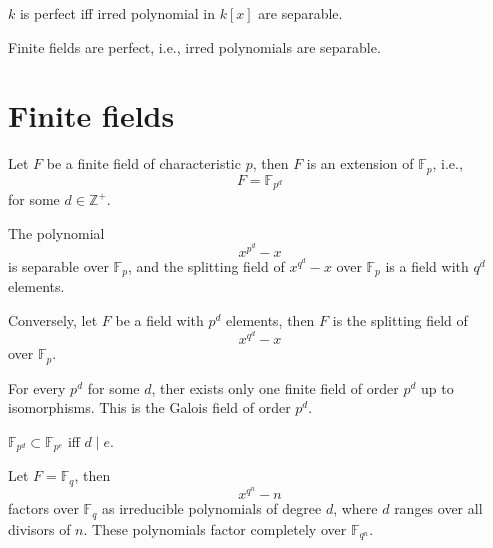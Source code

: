 \documentclass[openany]{book}
\newcommand{\Z}{\mathbb{Z}}
\newcommand{\F}{\mathbb{F}}
\begin{document}
\begin{prop}
    $k$ is perfect iff irred polynomial in $k[x]$ are separable.
\end{prop}

\begin{cor}
    Finite fields are perfect, i.e., irred polynomials are separable.
\end{cor}


\section{Finite fields}
\begin{defn}
    Let $F$ be a finite field of characteristic $p$, then $F$ is an extension of $\F_{p}$, i.e., 
    \begin{equation*}
        F=\F_{p^d}
    \end{equation*}
    for some $d\in\Z^+$.
\end{defn}

\begin{thm}
    The polynomial
    \begin{equation*}
        x^{p^d}-x
    \end{equation*}
    is separable over $\F_p$, and the splitting field of $x^{q^d}-x$ over $\F_p$ is a field with $q^d$ elements. 

    Conversely, let $F$ be a field with $p^d$ elements, then $F$ is the splitting field of 
    \begin{equation*}
        x^{q^d}-x
    \end{equation*}
    over $\F_p$.
\end{thm}


\begin{cor}
    For every $p^d$ for some $d$, ther exists only one finite field of order $p^d$ up to isomorphisms. This is the Galois field of order $p^d$.
\end{cor}



\begin{cor}
    $\F_{p^d}\subset\F_{p^e}$ iff $d\mid e$.
\end{cor}

\begin{cor}
    Let $F=\F_q$, then 
    \begin{equation*}
        x^{q^n}-n
    \end{equation*}
    factors over $\F_q$ as irreducible polynomials of degree $d$, where $d$ ranges over all divisors of $n$. These polynomials factor completely over $\F_{q^n}$.
\end{cor}
\end{document}
